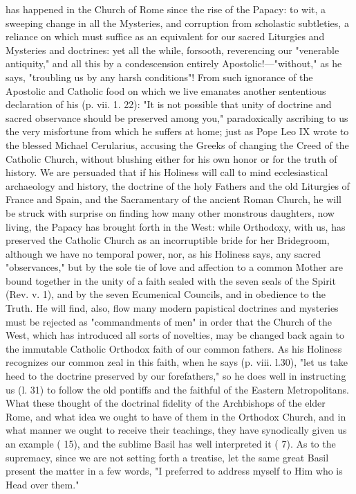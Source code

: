 has happened in the Church of Rome since the rise of the Papacy: to wit,
a sweeping change in all the Mysteries, and corruption from scholastic
subtleties, a reliance on which must suffice as an equivalent for our
sacred Liturgies and Mysteries and doctrines: yet all the while,
forsooth, reverencing our "venerable antiquity," and all this by a
condescension entirely Apostolic!---"without," as he says, "troubling us
by any harsh conditions"! From such ignorance of the Apostolic and
Catholic food on which we live emanates another sententious declaration
of his (p. vii. 1. 22): "It is not possible that unity of doctrine and
sacred observance should be preserved among you," paradoxically
ascribing to us the very misfortune from which he suffers at home; just
as Pope Leo IX wrote to the blessed Michael Cerularius, accusing the
Greeks of changing the Creed of the Catholic Church, without blushing
either for his own honor or for the truth of \emph{} history. We are
persuaded that if his Holiness will call to mind ecclesiastical
archaeology and history, the doctrine of \emph{} the holy Fathers and
the old Liturgies of France and Spain, and the Sacramentary of the
ancient Roman Church, he will be struck with surprise on finding how
many other monstrous daughters, now living, the Papacy has brought forth
in the West: while Orthodoxy, with us, has preserved the Catholic Church
as an incorruptible bride for her Bridegroom, although we have no
temporal power, nor, as his Holiness says, any sacred "observances," but
by the sole tie of love and affection to a common Mother are bound
together in the unity of a faith sealed with the seven seals of the
Spirit (Rev. v. 1), and by the seven Ecumenical Councils, and in
obedience to the Truth. He will find, also, flow many modern papistical
doctrines and mysteries must be rejected as "commandments of men" in
order that the Church of the West, which has introduced all sorts of
\emph{} novelties, may be changed back again to the immutable Catholic
Orthodox faith of our common fathers. As his Holiness recognizes our
common zeal in this faith, when he says (p. viii. l.30), "let us take
heed to the doctrine preserved by our forefathers," so he does well in
instructing us (l. 31) to follow the old pontiffs and the faithful of
the Eastern Metropolitans. What these thought of the doctrinal fidelity
of the Archbishops of the elder Rome, and what idea we ought to have of
them in the Orthodox Church, and in what manner we ought to receive
their teachings, they have synodically given us an example ( 15), and
the sublime Basil has well interpreted it ( 7). As to the supremacy,
since we are not setting forth a treatise, let the same great Basil
present the matter in a f\textquotesingle ew words, "I preferred to
address myself to Him who is Head over them."


